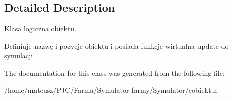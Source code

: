 \subsection{Detailed Description}
Klasa logiczna obiektu. 

Definiuje nazwę i pozycje obiektu i posiada funkcje wirtualna update do symulacji 

The documentation for this class was generated from the following file\+:\begin{DoxyCompactItemize}
\item 
/home/mateusz/\+P\+J\+C/\+Farma/\+Symulator-\/farmy/\+Symulator/cobiekt.\+h\end{DoxyCompactItemize}
